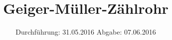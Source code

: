 
\subject{703}
\title{Geiger-Müller-Zählrohr}
\date{
  Durchführung: 31.05.2016
  \hspace{3em}
  Abgabe: 07.06.2016
}



\maketitle
\newpage
\mbox{}
\newpage
\thispagestyle{empty}
\tableofcontents
\newpage






\nocite{numpy}
\nocite{matplotlib}
\nocite{uncertainties}
\printbibliography


